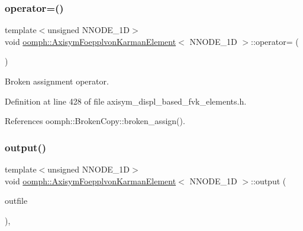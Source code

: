 \subsubsection{\texorpdfstring{operator=()}{operator=()}\hspace{0.1cm}{\footnotesize\ttfamily [2/2]}}
{\footnotesize\ttfamily template$<$unsigned N\+N\+O\+D\+E\+\_\+1D$>$ \\
void \hyperlink{classoomph_1_1AxisymFoepplvonKarmanElement}{oomph\+::\+Axisym\+Foepplvon\+Karman\+Element}$<$ N\+N\+O\+D\+E\+\_\+1D $>$\+::operator= (\begin{DoxyParamCaption}\item[{const \hyperlink{classoomph_1_1AxisymFoepplvonKarmanElement}{Axisym\+Foepplvon\+Karman\+Element}$<$ N\+N\+O\+D\+E\+\_\+1D $>$ \&}]{ }\end{DoxyParamCaption})\hspace{0.3cm}{\ttfamily [inline]}}



Broken assignment operator. 



Definition at line 428 of file axisym\+\_\+displ\+\_\+based\+\_\+fvk\+\_\+elements.\+h.



References oomph\+::\+Broken\+Copy\+::broken\+\_\+assign().

\mbox{\label{classoomph_1_1AxisymFoepplvonKarmanElement_a76cf09e19fc810a96251a64572248f76}} 
\subsubsection{\texorpdfstring{output()}{output()}\hspace{0.1cm}{\footnotesize\ttfamily [1/8]}}
{\footnotesize\ttfamily template$<$unsigned N\+N\+O\+D\+E\+\_\+1D$>$ \\
void \hyperlink{classoomph_1_1AxisymFoepplvonKarmanElement}{oomph\+::\+Axisym\+Foepplvon\+Karman\+Element}$<$ N\+N\+O\+D\+E\+\_\+1D $>$\+::output (\begin{DoxyParamCaption}\item[{std\+::ostream \&}]{outfile }\end{DoxyParamCaption})\hspace{0.3cm}{\ttfamily [inline]}, {\ttfamily [virtual]}}



